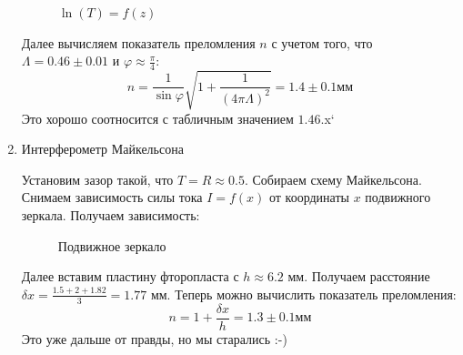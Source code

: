 \documentclass[a4paper,12pt]{article}
\renewcommand{\phi}{\ensuremath{\varphi}}
\theoremstyle{plain} %
\theoremstyle{definition} %
\theoremstyle{remark} %
\begin{document}
\begin{enumerate}
\begin{figure}[h!]
	\caption{$\ln(T) = f(z)$}
\end{figure}

Далее вычисляем показатель преломления $n$ с учетом того, что $\Lambda = 0.46 \pm 0.01$ и $\phi \approx \frac{\pi}{4}$:
\[
n = \frac{1}{\sin\phi}\sqrt{1+ \frac{1}{(4\pi\Lambda)^2}} = 1.4 \pm 0.1 \text{мм}
\]
Это хорошо соотносится с табличным значением $1.46$.x`
\item Интерферометр Майкельсона

Установим зазор такой, что $T = R \approx 0.5$. Собираем схему Майкельсона. Снимаем зависимость силы тока $I = f(x)$ от координаты $x$ подвижного зеркала. Получаем  зависимость:
\begin{figure}[h!]
	\caption{Подвижное зеркало}
\end{figure}
Далее вставим пластину фторопласта с $h \approx 6.2$ мм. Получаем расстояние $\delta x = \frac{1.5+2+1.82}{3} = 1.77  $ мм.
Теперь можно вычислить показатель преломления:
\[
n = 1 + \frac{\delta x }{h} = 1.3 \pm 0.1 \text{мм}
\]
Это уже дальше от правды, но мы старались :-)


\end{enumerate}
\end{document}
